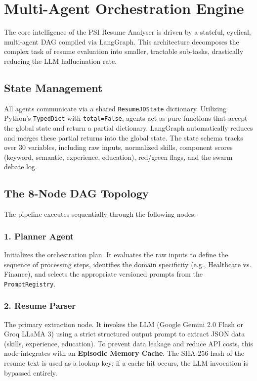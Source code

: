 \documentclass[10pt,journal,compsoc]{IEEEtran}
\begin{document}
\section{Multi-Agent Orchestration Engine}\label{sec:multi_agent}

The core intelligence of the PSI Resume Analyser is driven by a stateful, cyclical, multi-agent DAG compiled via LangGraph. This architecture decomposes the complex task of resume evaluation into smaller, tractable sub-tasks, drastically reducing the LLM hallucination rate.

\subsection{State Management}
All agents communicate via a shared \texttt{ResumeJDState} dictionary. Utilizing Python's \texttt{TypedDict} with \texttt{total=False}, agents act as pure functions that accept the global state and return a partial dictionary. LangGraph automatically reduces and merges these partial returns into the global state. The state schema tracks over 30 variables, including raw inputs, normalized skills, component scores (keyword, semantic, experience, education), red/green flags, and the swarm debate log.

\subsection{The 8-Node DAG Topology}
The pipeline executes sequentially through the following nodes:

\subsubsection{1. Planner Agent}
Initializes the orchestration plan. It evaluates the raw inputs to define the sequence of processing steps, identifies the domain specificity (e.g., Healthcare vs. Finance), and selects the appropriate versioned prompts from the \texttt{PromptRegistry}.

\subsubsection{2. Resume Parser}
The primary extraction node. It invokes the LLM (Google Gemini 2.0 Flash or Groq LLaMA 3) using a strict structured output prompt to extract JSON data (skills, experience, education). To prevent data leakage and reduce API costs, this node integrates with an \textbf{Episodic Memory Cache}. The SHA-256 hash of the resume text is used as a lookup key; if a cache hit occurs, the LLM invocation is bypassed entirely.
\end{document}
